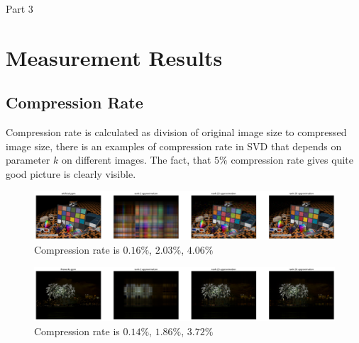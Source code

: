 \begin{algorithm}[H]
\caption{Part 3}
\end{algorithm}

\section{Measurement Results}

\subsection{Compression Rate}

Compression rate is calculated as division of original image size to compressed image size, there is an examples of compression rate in SVD that depends on parameter $k$ on different images. The fact, that $5\%$ compression rate gives quite good picture is clearly visible.

\begin{figure}[H]
  \centering
  \includegraphics[width=\linewidth]{artificial_ex.png}
  \caption{Compression rate is $0.16\%$, $2.03\%$, $4.06\%$}
  \label{fig:exmp_1}
\end{figure}

\begin{figure}[H]
  \centering
  \includegraphics[width=\linewidth]{fireworks_ex.png}
  \caption{Compression rate is $0.14\%$, $1.86\%$, $3.72\%$}
  \label{fig:exmp_3}
\end{figure}

